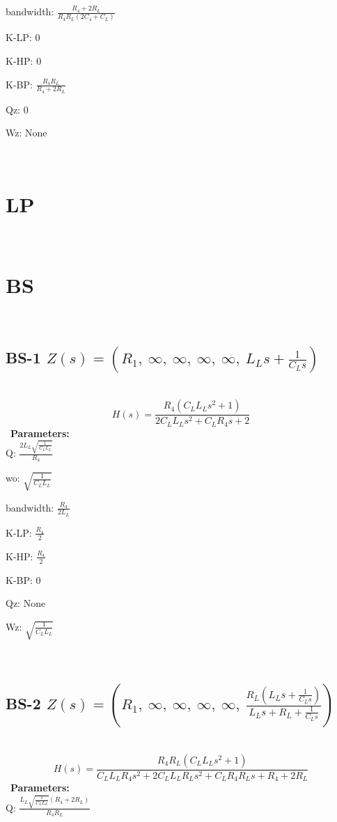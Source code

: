 \documentclass{article}
\begin{document}
bandwidth: $\frac{R_{4} + 2 R_{L}}{R_{4} R_{L} \left(2 C_{4} + C_{L}\right)}$\ 

K-LP: $0$\ 

K-HP: $0$\ 

K-BP: $\frac{R_{4} R_{L}}{R_{4} + 2 R_{L}}$\ 

Qz: $0$\ 

Wz: $\text{None}$\ 

\ 

\section{LP}\ 
\section{BS}\ 
\subsection{BS-1 $Z(s) = \left( R_{1}, \  \infty, \  \infty, \  \infty, \  \infty, \  L_{L} s + \frac{1}{C_{L} s}\right)$ } \ 
\textbf{\[H(s) = \frac{R_{4} \left(C_{L} L_{L} s^{2} + 1\right)}{2 C_{L} L_{L} s^{2} + C_{L} R_{4} s + 2}\] } \ 
\textbf{Parameters:}\\ 

Q: $\frac{2 L_{L} \sqrt{\frac{1}{C_{L} L_{L}}}}{R_{4}}$\ 

wo: $\sqrt{\frac{1}{C_{L} L_{L}}}$\ 

bandwidth: $\frac{R_{4}}{2 L_{L}}$\ 

K-LP: $\frac{R_{4}}{2}$\ 

K-HP: $\frac{R_{4}}{2}$\ 

K-BP: $0$\ 

Qz: $\text{None}$\ 

Wz: $\sqrt{\frac{1}{C_{L} L_{L}}}$\ 

\ 

\subsection{BS-2 $Z(s) = \left( R_{1}, \  \infty, \  \infty, \  \infty, \  \infty, \  \frac{R_{L} \left(L_{L} s + \frac{1}{C_{L} s}\right)}{L_{L} s + R_{L} + \frac{1}{C_{L} s}}\right)$ } \ 
\textbf{\[H(s) = \frac{R_{4} R_{L} \left(C_{L} L_{L} s^{2} + 1\right)}{C_{L} L_{L} R_{4} s^{2} + 2 C_{L} L_{L} R_{L} s^{2} + C_{L} R_{4} R_{L} s + R_{4} + 2 R_{L}}\] } \ 
\textbf{Parameters:}\\ 

Q: $\frac{L_{L} \sqrt{\frac{1}{C_{L} L_{L}}} \left(R_{4} + 2 R_{L}\right)}{R_{4} R_{L}}$\ 
\end{document}
